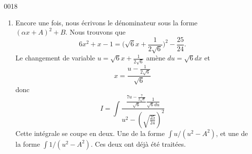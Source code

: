 \begin{corrige}{0018}
\begin{enumerate}
\item
Encore une fois, nous écrivons le dénominateur sous la forme $(\alpha x+A)^2+B$. Nous trouvons que
\begin{equation}
	6x^2+x-1=\big( \sqrt{6}x+\frac{1}{ 2\sqrt{6} } \big)^2-\frac{ 25 }{ 24 }.
\end{equation}
Le changement de variable $u=\sqrt{6}x+\frac{1}{ 2\sqrt{6} }$ amène $du=\sqrt{6}dx$ et 
\begin{equation}
	x=\frac{ u-\frac{1}{ 2\sqrt{6} } }{ \sqrt{6}} 
\end{equation}
donc 
\begin{equation}
	I=\int \frac{ \frac{ 7u-\frac{ 7 }{ 2\sqrt{6} } }{\sqrt{6}}\frac{1}{ \sqrt{6}du } } {  u^2-\left( \sqrt{\frac{ 25 }{ 24 }} \right)^2  }
\end{equation}
Cette intégrale se coupe en deux. Une de la forme $\int u/(u^2-A^2)$, et une de la forme $\int 1/(u^2-A^2)$. Ces deux ont déjà été traitées.


\end{enumerate}


\end{corrige}
